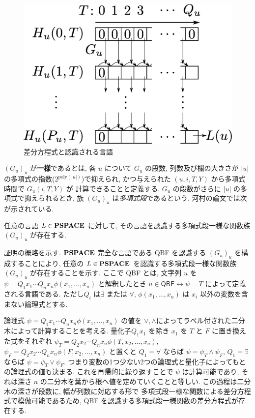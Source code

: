  \begin{figure}
  \label{fig:divp}
  \begin{center}
   \includegraphics[height=0.2\textheight]{image/divp.eps}
  \end{center}
  \caption{差分方程式と認識される言語}
 \end{figure}

$(G_u)_u$ が{\bf 一様}であるとは,
各 $u$ について $G _u$ の段数, 列数及び欄の大きさが $|u|$ の多項式の指数($2^{\mathrm{poly} (|u|)}$)で抑えられ, 
かつ与えられた $(u, i, T, Y)$ から多項式時間で $G_u(i, T, Y)$ が
計算できることと定義する.
$G_u$ の段数がさらに $|u|$ の多項式で抑えられるとき, 
族 $(G_u) _u$ は\emph{多項式段}であるという. 
河村の論文では次が示されている.

 \begin{lemma}
  \label{WeakFeedback}
  任意の言語 $L \in \mathbf{PSPACE}$ に対して,
  その言語を認識する多項式段一様な関数族 $(G_u)_u$ が存在する.
 \end{lemma}

証明の概略を示す.
$\mathbf{PSPACE}$ 完全な言語である
\textsf{QBF} を認識する $(G_u)_u$ を構成することにより,
任意の $L \in \mathbf{PSPACE}$ を認識する多項式段一様な関数族 $(G_u)_u$ が存在することを示す.
ここで \textsf{QBF} とは,
文字列 $u$ を $\psi = Q_1 x_1 \cdots Q_n x_n \phi(x_1, \dots, x_n)$ と解釈したとき 
$u \in \textsf{QBF} \leftrightarrow \psi = T$ によって定義される言語である. 
ただし$Q_i$ は$\exists$ または $\forall$,  
$\phi(x_1, \dots, x_n)$ は $x_i$ 以外の変数を含まない論理式とする. 

論理式 $\psi = Q_1 x_1 \cdots Q_n x_n \phi(x_1, \dots, x_n)$ の値を
$\vee, \wedge$によってラベル付された二分木によって計算することを考える. 
量化子$Q_1 x_1$ を除き $x_1$ を $T$ と $F$ に置き換えた式をそれぞれ
$\psi_T = Q_2 x_2 \cdots Q_n x_n \phi(T, x_2, \dots, x_n)$,
$\psi_F = Q_2 x_2 \cdots Q_n x_n \phi(F, x_2, \dots, x_n)$ と置くと
$Q_1=\forall$ ならば $\psi = \psi_T \wedge \psi_F$, 
$Q_1=\exists$ ならば $\psi = \psi_T \vee \psi_F$.
つまり変数の1つ少ない2つの論理式と量化子によってもとの論理式の値も決まる.
これを再帰的に繰り返すことで $\psi$ は計算可能であり, 
それは深さ $n$ の二分木を葉から根へ値を定めていくことと等しい.
この過程は二分木の深さが段数に, 幅が列数に対応する形で
多項式段一様な関数による差分方程式で模倣可能であるため,
\textsf{QBF} を認識する多項式段一様関数の差分方程式が存在する.


